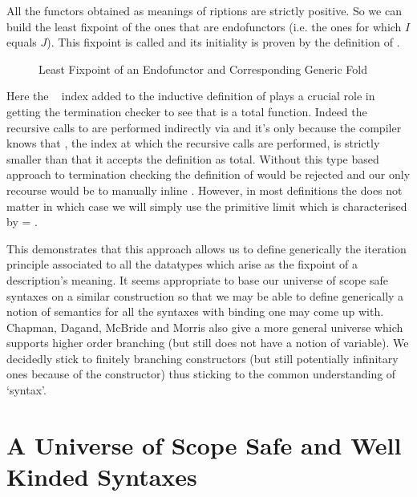 All the functors obtained as meanings of riptions are strictly
positive. So we can build the least fixpoint of the ones that are endofunctors
(i.e. the ones for which $I$ equals $J$). This fixpoint is called 
and its initiality is proven by the definition of  .

\begin{figure}[h]
\caption{Least Fixpoint of an Endofunctor and Corresponding Generic Fold}
\end{figure}

Here the ~\cite{DBLP:journals/corr/abs-1012-4896} index added
to the inductive definition of  plays a crucial role in getting
the termination checker to see that  is a total function.
Indeed the recursive calls to  are performed indirectly via
 and it's only because the compiler knows that , the index
at which the recursive calls are performed, is strictly smaller than
  that it accepts the definition as total. Without this type
based approach to termination checking the definition of  would
be rejected and our only recourse would be to manually inline .
However, in most definitions the  does not matter in which case
we will simply use the primitive limit   which is
characterised by  =  . 

This demonstrates that this approach allows us to define generically
the iteration principle associated to all the datatypes which arise
as the fixpoint of a description's meaning. It seems appropriate to
base our universe of scope safe syntaxes on a similar construction
so that we may be able to define generically a notion of semantics
for all the syntaxes with binding one may come up with. Chapman,
Dagand, McBride and Morris also give a more general universe which
supports higher order branching (but still does not have a notion
of variable). We decidedly stick to finitely branching constructors
(but still potentially infinitary ones because of the 
constructor) thus sticking to the common understanding of `syntax'.




\section{A Universe of Scope Safe and Well Kinded Syntaxes}

